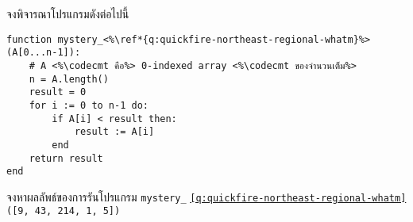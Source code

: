 \question{\label{q:quickfire-northeast-regional-whatm}}

จงพิจารณาโปรแกรมดังต่อไปนี้
\begin{lstlisting}
function mystery_<%\ref*{q:quickfire-northeast-regional-whatm}%>(A[0...n-1]):
    # A <%\codecmt คือ%> 0-indexed array <%\codecmt ของจำนวนเต็ม%>
    n = A.length()
    result = 0
    for i := 0 to n-1 do:
        if A[i] < result then:
            result := A[i]
        end
    return result
end
\end{lstlisting}

จงหาผลลัพธ์ของการรันโปรแกรม \lstinline{mystery_}%
\texttt{\small\ref*{q:quickfire-northeast-regional-whatm}}%
\lstinline{([9, 43, 214, 1, 5])}
